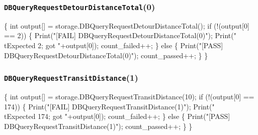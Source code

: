 \documentclass{article}
\def\nwendcode{\endtrivlist \endgroup}
\let\nwdocspar=\par
\begin{document}
\subsubsection{{\tt{}DBQueryRequestDetourDistanceTotal}(0)}
\nwenddocs{}\endmoddef{}
\{
  int output[] = storage.DBQueryRequestDetourDistanceTotal();
  if (!(output[0] == 2)) \{
    Print("[FAIL] DBQueryRequestDetourDistanceTotal(0)");
    Print("\\tExpected 2; got "+output[0]);
    count_failed++;
  \} else \{
    Print("[PASS] DBQueryRequestDetourDistanceTotal(0)");
    count_passed++;
  \}
\}
\nwendcode{}\nwdocspar
\subsubsection{{\tt{}DBQueryRequestTransitDistance}(1)}
\nwenddocs{}\endmoddef{}
\{
  int output[] = storage.DBQueryRequestTransitDistance(10);
  if (!(output[0] == 174)) \{
    Print("[FAIL] DBQueryRequestTransitDistance(1)");
    Print("\\tExpected 174; got "+output[0]);
    count_failed++;
  \} else \{
    Print("[PASS] DBQueryRequestTransitDistance(1)");
    count_passed++;
  \}
\}
\nwendcode{}\nwdocspar
\end{document}
